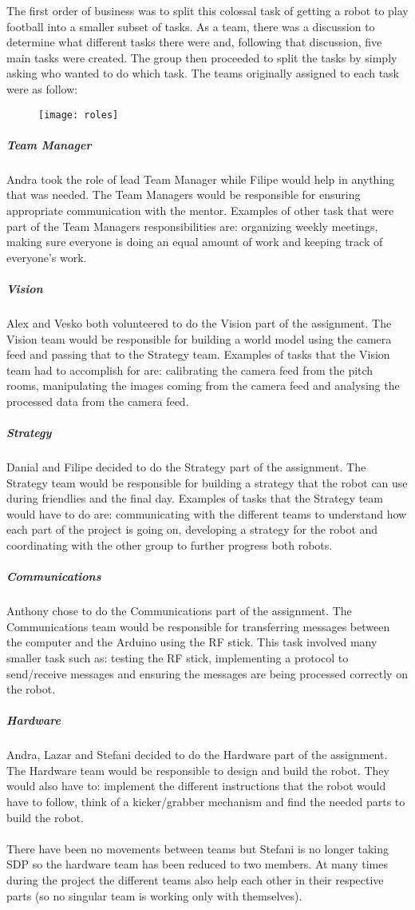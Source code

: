 The first order of business was to split this colossal task of getting a robot to play football into a smaller subset of tasks. As a team, there was a discussion to determine what different tasks there were and, following that discussion, five main tasks were created. The group then proceeded to split the tasks by simply asking who wanted to do which task. The teams originally assigned to each task were as follow:

\begin{figure}[H]
    \centering
    \texttt{[image: roles]}
    \label{fig:roles}
\end{figure}

\subparagraph{Team Manager}
Andra took the role of lead Team Manager while Filipe would help in anything that was needed. The Team Managers would be responsible for ensuring appropriate communication with the mentor. Examples of other task that were part of the Team Managers responsibilities are: organizing weekly meetings, making sure everyone is doing an equal amount of work and keeping track of everyone's work.


\subparagraph{Vision}
Alex and Vesko both volunteered to do the Vision part of the assignment. The Vision team would be responsible for building a world model using the camera feed and passing that to the Strategy team. Examples of tasks that the Vision team had to accomplish for are: calibrating the camera feed from the pitch rooms, manipulating the images coming from the camera feed and analysing the processed data from the camera feed.

\subparagraph{Strategy}
Danial and Filipe decided to do the Strategy part of the assignment. The Strategy team would be responsible for building a strategy that the robot can use during friendlies and the final day. Examples of tasks that the Strategy team would have to do are: communicating with the different teams to understand how each part of the project is going on, developing a strategy for the robot and coordinating with the other group to further progress both robots.

\subparagraph{Communications}
Anthony chose to do the Communications part of the assignment. The Communications team would be responsible for transferring messages between the computer and the Arduino using the RF stick. This task involved many smaller task such as: testing the RF stick, implementing a protocol to send/receive messages and ensuring the messages are being processed correctly on the robot.

\subparagraph{Hardware}
Andra, Lazar and Stefani decided to do the Hardware part of the assignment. The Hardware team would be responsible to design and build the robot. They would also have to: implement the different instructions that the robot would have to follow, think of a kicker/grabber mechanism and find the needed parts to build the robot.
\\ \\
There have been no movements between teams but Stefani is no longer taking SDP so the hardware team has been reduced to two members. At many times during the project the different teams also help each other in their respective parts (so no singular team is working only with themselves).
